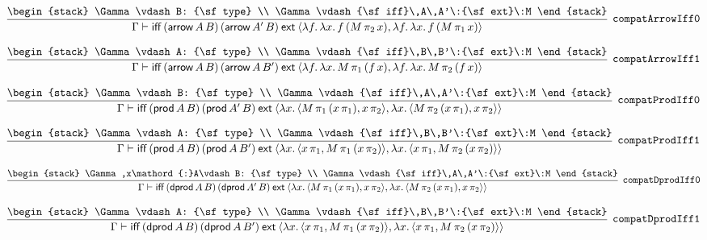 \[
\infer[{\tt compatArrowIff0}]{\Gamma \vdash {\sf iff}\,({\sf arrow}\,A\,B)\,({\sf arrow}\,A'\,B)\:{\sf ext}\:\langle \lambda f.\,\lambda x.\,f\,(M\, \pi_2\,x),\lambda f.\,\lambda x.\,f\,(M\, \pi_1\,x)\rangle }{
\begin{stack}
\Gamma \vdash B: {\sf type}
\\
\Gamma \vdash {\sf iff}\,A\,A'\:{\sf ext}\:M
\end{stack}}
\]

\[
\infer[{\tt compatArrowIff1}]{\Gamma \vdash {\sf iff}\,({\sf arrow}\,A\,B)\,({\sf arrow}\,A\,B')\:{\sf ext}\:\langle \lambda f.\,\lambda x.\,M\, \pi_1\,(f\,x),\lambda f.\,\lambda x.\,M\, \pi_2\,(f\,x)\rangle }{
\begin{stack}
\Gamma \vdash A: {\sf type}
\\
\Gamma \vdash {\sf iff}\,B\,B'\:{\sf ext}\:M
\end{stack}}
\]

\[
\infer[{\tt compatProdIff0}]{\Gamma \vdash {\sf iff}\,({\sf prod}\,A\,B)\,({\sf prod}\,A'\,B)\:{\sf ext}\:\langle \lambda x.\,\langle M\, \pi_1\,(x\, \pi_1),x\, \pi_2\rangle ,\lambda x.\,\langle M\, \pi_2\,(x\, \pi_1),x\, \pi_2\rangle \rangle }{
\begin{stack}
\Gamma \vdash B: {\sf type}
\\
\Gamma \vdash {\sf iff}\,A\,A'\:{\sf ext}\:M
\end{stack}}
\]

\[
\infer[{\tt compatProdIff1}]{\Gamma \vdash {\sf iff}\,({\sf prod}\,A\,B)\,({\sf prod}\,A\,B')\:{\sf ext}\:\langle \lambda x.\,\langle x\, \pi_1,M\, \pi_1\,(x\, \pi_2)\rangle ,\lambda x.\,\langle x\, \pi_1,M\, \pi_2\,(x\, \pi_2)\rangle \rangle }{
\begin{stack}
\Gamma \vdash A: {\sf type}
\\
\Gamma \vdash {\sf iff}\,B\,B'\:{\sf ext}\:M
\end{stack}}
\]

\[
\infer[{\tt compatDprodIff0}]{\Gamma \vdash {\sf iff}\,({\sf dprod}\,A\,B)\,({\sf dprod}\,A'\,B)\:{\sf ext}\:\langle \lambda x.\,\langle M\, \pi_1\,(x\, \pi_1),x\, \pi_2\rangle ,\lambda x.\,\langle M\, \pi_2\,(x\, \pi_1),x\, \pi_2\rangle \rangle }{
\begin{stack}
\Gamma ,x\mathord{:}A\vdash B: {\sf type}
\\
\Gamma \vdash {\sf iff}\,A\,A'\:{\sf ext}\:M
\end{stack}}
\]

\[
\infer[{\tt compatDprodIff1}]{\Gamma \vdash {\sf iff}\,({\sf dprod}\,A\,B)\,({\sf dprod}\,A\,B')\:{\sf ext}\:\langle \lambda x.\,\langle x\, \pi_1,M\, \pi_1\,(x\, \pi_2)\rangle ,\lambda x.\,\langle x\, \pi_1,M\, \pi_2\,(x\, \pi_2)\rangle \rangle }{
\begin{stack}
\Gamma \vdash A: {\sf type}
\\
\Gamma \vdash {\sf iff}\,B\,B'\:{\sf ext}\:M
\end{stack}}
\]

